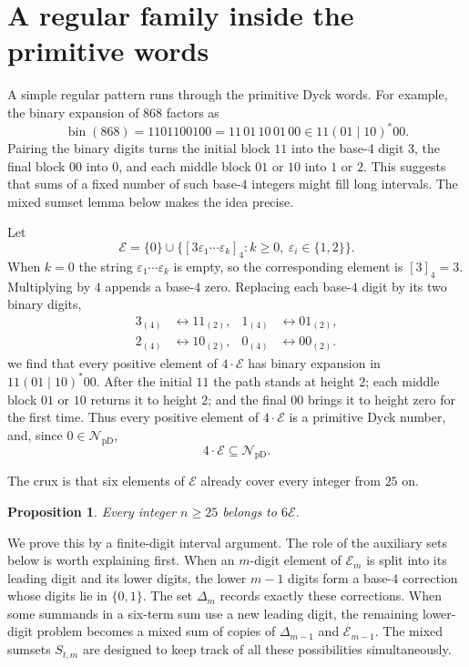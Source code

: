 \documentclass[12pt]{article}
\theoremstyle{plain}
\newtheorem{proposition}[theorem]{Proposition}
\newcommand{\val}[2]{[#1]_{#2}}
\newcommand{\NpD}{\mathcal{N}_{\mathrm{pD}}}
\begin{document}
\section{A regular family inside the primitive words}

A simple regular pattern runs through the primitive Dyck words.  For
example, the binary expansion of $868$ factors as
\[
 \operatorname{bin}(868)=1101100100=11\,01\,10\,01\,00
 \in 11(01\mid10)^*00 .
\]
Pairing the binary digits turns the initial block $11$ into the base-$4$
digit $3$, the final block $00$ into $0$, and each middle block $01$ or
$10$ into $1$ or $2$.  This suggests that sums of a fixed number of such
base-$4$ integers might fill long intervals.  The mixed sumset lemma
below makes the idea precise.

Let
\[
 \mathcal E=\{0\}\cup
 \bigl\{\val{3\varepsilon_1\cdots\varepsilon_k}{4}:
        k\geq0,\ \varepsilon_i\in\{1,2\}\bigr\}.
\]
When $k=0$ the string $\varepsilon_1\cdots\varepsilon_k$ is empty, so
the corresponding element is $\val{3}{4}=3$.  Multiplying by $4$ appends
a base-$4$ zero.  Replacing each base-$4$ digit by its two binary digits,
\[
\begin{aligned}
 3_{(4)}&\longleftrightarrow11_{(2)},&
 1_{(4)}&\longleftrightarrow01_{(2)},\\
 2_{(4)}&\longleftrightarrow10_{(2)},&
 0_{(4)}&\longleftrightarrow00_{(2)}.
\end{aligned}
\]
we find that every positive element of $4\cdot\mathcal E$ has binary
expansion in $11(01\mid10)^*00$.  After the initial $11$ the path stands
at height $2$; each middle block $01$ or $10$ returns it to height $2$;
and the final $00$ brings it to height zero for the first time.  Thus
every positive element of $4\cdot\mathcal E$ is a primitive Dyck number,
and, since $0\in\NpD$,
\begin{equation}\label{eq:4E}
        4\cdot\mathcal E\subseteq\NpD.
\end{equation}

The crux is that six elements of $\mathcal E$ already cover every integer
from $25$ on.

\begin{proposition}\label{prop:E}
Every integer $n\geq25$ belongs to $6\mathcal E$.
\end{proposition}

We prove this by a finite-digit interval argument.  The role of the
auxiliary sets below is worth explaining first.  When an $m$-digit element
of $\mathcal E_{m}$ is split into its leading digit and its lower digits, the
lower $m-1$ digits form a base-$4$ correction whose digits lie in
$\{0,1\}$.  The set $\Delta_m$ records exactly these corrections.  When
some summands in a six-term sum use a new leading digit, the remaining
lower-digit problem becomes a mixed sum of copies of $\Delta_{m-1}$ and
$\mathcal E_{m-1}$.  The mixed sumsets $S_{t,m}$ are designed to keep
track of all these possibilities simultaneously.
\end{document}
